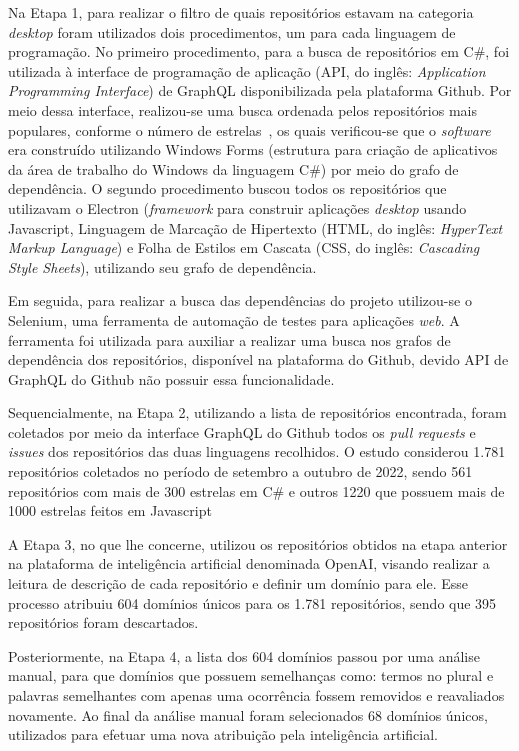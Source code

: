 \documentclass[12pt]{article}
\begin{document}
Na Etapa 1, para realizar o filtro de quais repositórios estavam na categoria \textit{desktop} foram utilizados dois procedimentos, um para cada linguagem de programação. No primeiro procedimento, para a busca de repositórios em C\#, foi utilizada à interface de programação de aplicação (API, do inglês: \textit{Application Programming Interface}) de GraphQL disponibilizada pela plataforma Github. Por meio dessa interface, realizou-se uma busca ordenada pelos repositórios mais populares, conforme o número de estrelas~\cite{DBLP:journals/corr/abs-1811-07643}, os quais verificou-se que o \textit{software} era construído utilizando Windows Forms (estrutura para criação de aplicativos da área de trabalho do Windows da linguagem C\#) por meio do grafo de dependência. O segundo procedimento buscou todos os repositórios que utilizavam o Electron (\textit{framework} para construir aplicações \textit{desktop} usando Javascript, Linguagem de Marcação de Hipertexto (HTML, do inglês: \textit{HyperText Markup Language}) e Folha de Estilos em Cascata (CSS, do inglês: \textit{Cascading Style Sheets}), utilizando seu grafo de dependência.

Em seguida, para realizar a busca das dependências do projeto utilizou-se o Selenium, uma ferramenta de automação de testes para aplicações \textit{web}. A ferramenta foi utilizada para auxiliar a realizar uma busca nos grafos de dependência dos repositórios, disponível na plataforma do Github, devido API de GraphQL do Github não possuir essa funcionalidade.

Sequencialmente, na Etapa 2, utilizando a lista de repositórios encontrada, foram coletados por meio da interface GraphQL do Github todos os \textit{pull requests} e \textit{issues} dos repositórios das duas linguagens recolhidos. O estudo considerou 1.781 repositórios coletados no período de setembro a outubro de 2022, sendo 561 repositórios com mais de 300 estrelas em C\# e outros 1220 que possuem mais de 1000 estrelas feitos em Javascript

A Etapa 3, no que lhe concerne, utilizou os repositórios obtidos na etapa anterior na plataforma de inteligência artificial denominada OpenAI, visando realizar a leitura de descrição de cada repositório e definir um domínio para ele. Esse processo atribuiu 604 domínios únicos para os 1.781 repositórios, sendo que 395 repositórios foram descartados.

Posteriormente, na Etapa 4, a lista dos 604 domínios passou por uma análise manual, para que domínios que possuem semelhanças como: termos no plural e palavras semelhantes com apenas uma ocorrência fossem removidos e reavaliados novamente. Ao final da análise manual foram selecionados 68 domínios únicos, utilizados para efetuar uma nova atribuição pela inteligência artificial.
\end{document}
